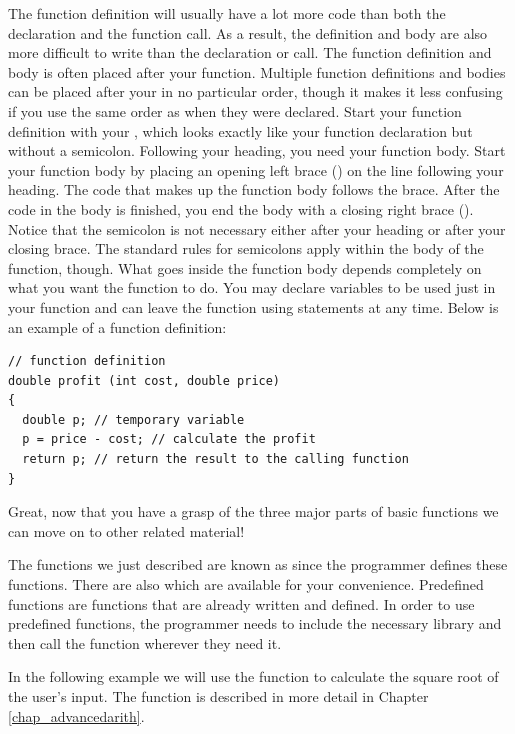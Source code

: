 The function definition will usually have a lot more code than both the declaration and the function call.
As a result, the definition and body are also more difficult to write than the declaration or call. 
The function definition and body is often placed after your  function. 
Multiple function definitions and bodies can be placed after your  in no particular order, though it makes it less confusing if you use the same order as when they were declared.  
Start your function definition with your , which looks exactly like your function declaration but without a semicolon. 
Following your heading, you need your function body. 
Start your function body by placing an opening left brace (\Code{\{}) on the line following your heading. 
The code that makes up the function body follows the brace.
After the code in the body is finished, you end the body with a closing right brace (\Code{\}}). 
Notice that the semicolon is not necessary either after your heading or after your closing brace. 
The standard rules for semicolons apply within the body of the function, though.  
What goes inside the function body depends completely on what you want the function to do. 
You may declare variables to be used just in your function and can leave the function using  statements at any time. 
Below is an example of a function definition:\nopagebreak[4]

\noindent\begin{minipage}{\linewidth}\begin{lstlisting} 
// function definition
double profit (int cost, double price) 
{
  double p; // temporary variable
  p = price - cost; // calculate the profit
  return p; // return the result to the calling function
}
\end{lstlisting}\end{minipage}
 
Great, now that you have a grasp of the three major parts of basic functions we can move on to other related material!
 
The functions we just described are known as  since the programmer defines these functions. 
There are also  which are available for your convenience. 
Predefined functions are functions that are already written and defined. 
In order to use predefined functions, the programmer needs to include the necessary library and then call the function wherever they need it.

In the following example we will use the  function to calculate the square root of the user's input. The  function is described in more detail in Chapter \ref{chap_advancedarith}.
 
